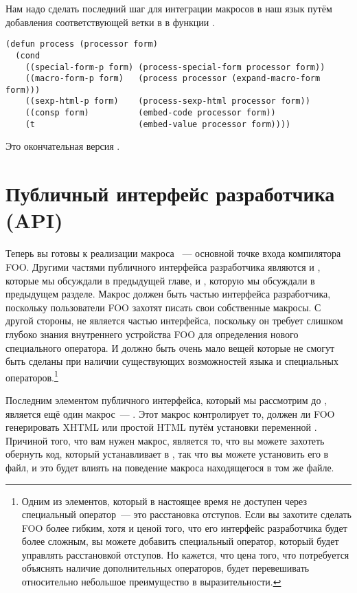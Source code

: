Нам надо сделать последний шаг для интеграции макросов в наш язык путём добавления
соответствующей ветки в  в функции .

\begin{lstlisting}
(defun process (processor form)
  (cond
    ((special-form-p form) (process-special-form processor form))
    ((macro-form-p form)   (process processor (expand-macro-form form)))
    ((sexp-html-p form)    (process-sexp-html processor form))
    ((consp form)          (embed-code processor form))
    (t                     (embed-value processor form))))
\end{lstlisting}

Это окончательная версия .

\section{Публичный интерфейс разработчика (API)}

Теперь вы готовы к реализации макроса ~--- основной точке входа компилятора
FOO. Другими частями публичного интерфейса разработчика являются  и
, которые мы обсуждали в предыдущей главе, и
, которую мы обсуждали в предыдущем разделе. Макрос
 должен быть частью интерфейса разработчика, поскольку
пользователи FOO захотят писать свои собственные макросы. С другой стороны,
 не является частью интерфейса, поскольку он требует
слишком глубоко знания внутреннего устройства FOO для определения нового специального
оператора. И должно быть очень мало вещей которые не смогут быть сделаны при наличии
существующих возможностей языка и специальных операторов.\footnote{Одним из элементов,
  который в настоящее время не доступен через специальный оператор~--- это расстановка
  отступов.  Если вы захотите сделать FOO более гибким, хотя и ценой того, что его
  интерфейс разработчика будет более сложным, вы можете добавить специальный оператор,
  который будет управлять расстановкой отступов.  Но кажется, что цена того, что
  потребуется объяснять наличие дополнительных операторов, будет перевешивать относительно
  небольшое преимущество в выразительности.}

Последним элементом публичного интерфейса, который мы рассмотрим до , является
ещё один макрос~--- .  Этот макрос контролирует то, должен ли FOO
генерировать XHTML или простой HTML путём установки переменной .  Причиной
того, что вам нужен макрос, является то, что вы можете захотеть обернуть код, который
устанавливает  в , так что вы можете установить его в файл,
и это будет влиять на поведение макроса  находящегося в том же файле.

